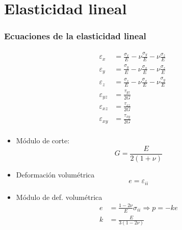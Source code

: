 \documentclass{beamer}
\begin{document}
\section{Elasticidad lineal}
\begin{frame}
\frametitle{Ecuaciones de la elasticidad lineal}

\parbox{0.3\textwidth}{
\begin{align*}
\varepsilon_x&=\frac{\sigma_x}{E}-\nu \frac{\sigma_y}{E}-\nu \frac{\sigma_z}{E}
\\
\varepsilon_y&=\frac{\sigma_y}{E}-\nu \frac{\sigma_x}{E}-\nu \frac{\sigma_z}{E}
\\
\varepsilon_z&=\frac{\sigma_z}{E}-\nu \frac{\sigma_x}{E}-\nu \frac{\sigma_y}{E}
\\
\varepsilon_{yz}&=\frac{\tau_{yz}}{2G} \\
\varepsilon_{xz}&=\frac{\tau_{xz}}{2G} \\
\varepsilon_{xy}&=\frac{\tau_{xy}}{2G} \\
\end{align*}
}\parbox{0.6\textwidth}{
\begin{itemize}
\item Módulo de corte:
$$
G=\frac{E}{2(1+\nu)}
$$
\item Deformación volumétrica
$$
e=\varepsilon_{ii}
$$
\item Módulo de def. volumétrica
\begin{align*}
e&=\frac{1-2\nu}{E}\sigma_{ii} \Rightarrow p=-k e \\
k&=\frac{E}{3(1-2\nu)}
\end{align*}
\end{itemize}
}
\end{frame}
\end{document}
